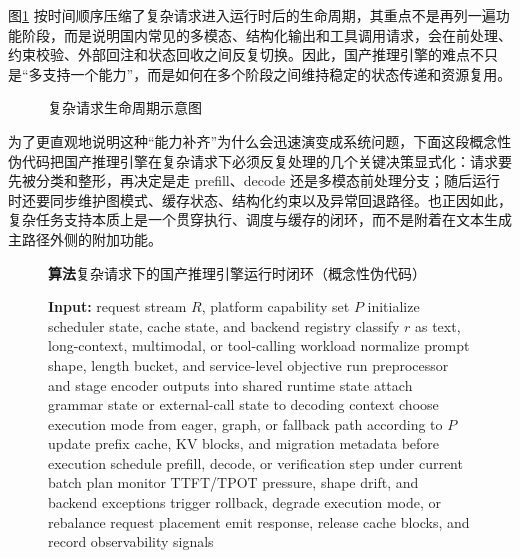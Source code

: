 图\ref{fig:complex-request-lifecycle} 按时间顺序压缩了复杂请求进入运行时后的生命周期，其重点不是再列一遍功能阶段，而是说明国内常见的多模态、结构化输出和工具调用请求，会在前处理、约束校验、外部回注和状态回收之间反复切换。因此，国产推理引擎的难点不只是“多支持一个能力”，而是如何在多个阶段之间维持稳定的状态传递和资源复用。

\begin{figure}[t]
\centering
\resizebox{0.98\linewidth}{!}{}
\caption{复杂请求生命周期示意图}
\label{fig:complex-request-lifecycle}
\end{figure}

为了更直观地说明这种“能力补齐”为什么会迅速演变成系统问题，下面这段概念性伪代码把国产推理引擎在复杂请求下必须反复处理的几个关键决策显式化：请求要先被分类和整形，再决定是走 prefill、decode 还是多模态前处理分支；随后运行时还要同步维护图模式、缓存状态、结构化约束以及异常回退路径。也正因如此，复杂任务支持本质上是一个贯穿执行、调度与缓存的闭环，而不是附着在文本生成主路径外侧的附加功能。

\begin{figure}[t]
\centering
{}
\captionsetup{type=figure}
\begin{minipage}{0.96\linewidth}
\small
\textbf{算法\thealgorithm}\quad 复杂请求下的国产推理引擎运行时闭环（概念性伪代码）\label{alg:runtime-loop}
\vspace{0.4em}
\begin{algorithmic}[1]
\State \textbf{Input:} request stream $R$, platform capability set $P$
\State initialize scheduler state, cache state, and backend registry
	\State classify $r$ as text, long-context, multimodal, or tool-calling workload
	\State normalize prompt shape, length bucket, and service-level objective
		\State run preprocessor and stage encoder outputs into shared runtime state
	\EndIf
		\State attach grammar state or external-call state to decoding context
	\EndIf
	\State choose execution mode from eager, graph, or fallback path according to $P$
	\State update prefix cache, KV blocks, and migration metadata before execution
		\State schedule prefill, decode, or verification step under current batch plan
		\State monitor TTFT/TPOT pressure, shape drift, and backend exceptions
			\State trigger rollback, degrade execution mode, or rebalance request placement
		\EndIf
	\EndWhile
	\State emit response, release cache blocks, and record observability signals
\EndFor
\end{algorithmic}
\end{minipage}
\end{figure}

